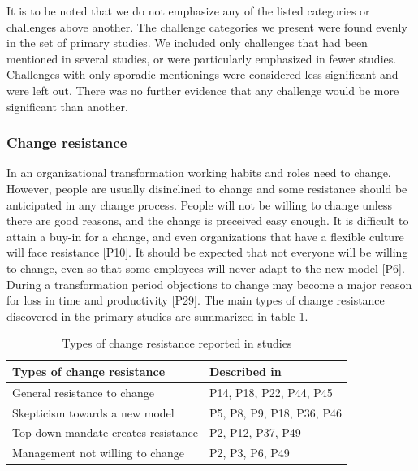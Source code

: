 \documentclass[preprint,authoryear,12pt]{elsarticle}
\begin{document}
It is to be noted that we do not emphasize any of the listed categories or
challenges above another. The challenge categories we present were found evenly
in the set of primary studies. We included only challenges that had been
mentioned in several studies, or were particularly emphasized in fewer studies.
Challenges with only sporadic mentionings were considered less significant and
were left out. There was no further evidence that any challenge would be more
significant than another.


\subsubsection{Change resistance}

In an organizational transformation working habits and roles need to change.
However, people are usually disinclined to change and some resistance should be
anticipated in any change process. People will not be willing to change unless
there are good reasons, and the change is preceived easy enough. It is difficult
to attain a buy-in for a change, and even organizations that have a flexible
culture will face resistance [P10]. It should be expected that not everyone will
be willing to change, even so that some employees will never adapt to the new
model [P6]. During a transformation period objections to change may become a
major reason for loss in time and productivity [P29]. The main types of change
resistance discovered in the primary studies are summarized in table
\ref{table:challenges_changeresistance}.

\begin{table}[b]
    \begin{tabular}{ l l }
        \toprule
        Types of change resistance           &  Described in  \\
        \midrule
        General resistance to change         &  P14, P18, P22, P44, P45   \\
        Skepticism towards a new model       &  P5, P8, P9, P18, P36, P46 \\
        Top down mandate creates resistance  &  P2, P12, P37, P49 \\
        Management not willing to change     &  P2, P3, P6, P49 \\
        \bottomrule
    \end{tabular}
    \caption{Types of change resistance reported in studies}
    \label{table:challenges_changeresistance}
\end{table}
\end{document}
